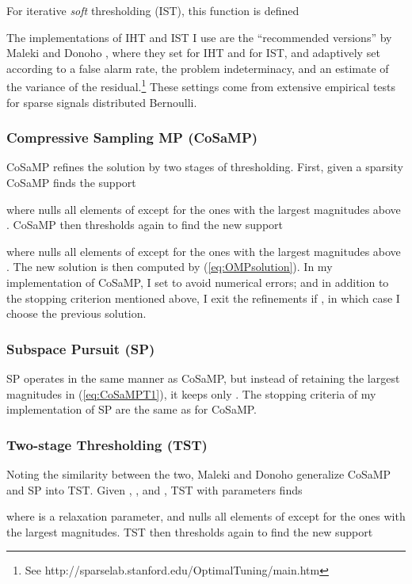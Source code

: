 \documentclass[11pt,draftcls,onecolumn]{IEEEtran}
\begin{document}
For iterative {\em soft} thresholding (IST), this function is defined

The implementations of IHT and IST I use 
are the ``recommended versions'' by Maleki and Donoho \cite{Maleki2010},
where they set  for IHT and  for IST,
and adaptively set  
according to a false alarm rate,
the problem indeterminacy,
and an estimate of the variance of the residual.\footnote{See http://sparselab.stanford.edu/OptimalTuning/main.htm}
These settings come from extensive empirical tests 
for sparse signals distributed Bernoulli.


\subsubsection{Compressive Sampling MP (CoSaMP) \cite{Needell2009}}
CoSaMP refines the solution  by two stages of thresholding.
First, given a sparsity  CoSaMP finds the support

where  nulls all elements of  
except for the  ones with the largest magnitudes above .
CoSaMP then thresholds again to find the new support

where  nulls all elements of  
except for the  ones with the largest magnitudes above .
The new solution  is then computed by (\ref{eq:OMPsolution}).
In my implementation of CoSaMP,
I set  to avoid numerical errors;
and in addition to the stopping criterion mentioned above,
I exit the refinements if ,
in which case I choose the previous solution.

\subsubsection{Subspace Pursuit (SP) \cite{Dai2009}}
SP operates in the same manner as CoSaMP,
but instead of retaining the  largest magnitudes in (\ref{eq:CoSaMPT1}),
it keeps only .
The stopping criteria of my implementation of SP
are the same as for CoSaMP.

\subsubsection{Two-stage Thresholding (TST) \cite{Maleki2010}}
Noting the similarity between the two,
Maleki and Donoho generalize CoSaMP and SP into TST.
Given , , and , TST with parameters  finds

where  is a relaxation parameter,
and  nulls all elements of  
except for the  ones with the largest magnitudes.
TST then thresholds again to find the new support
\end{document}
